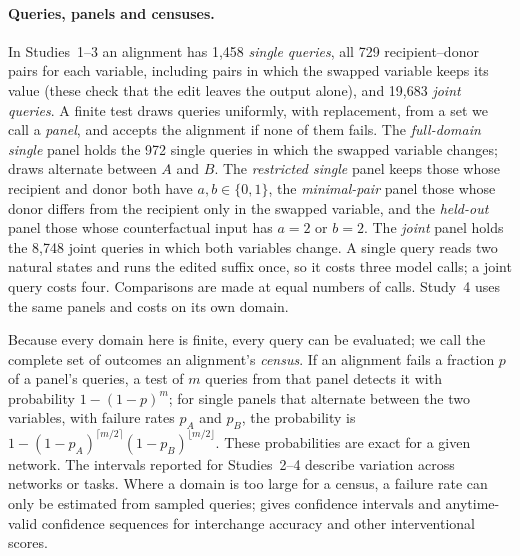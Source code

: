 \paragraph{Queries, panels and censuses.}
In Studies~1--3 an alignment has 1,458 \emph{single queries}, all 729 recipient--donor pairs for each variable,
including pairs in which the swapped variable keeps its value (these check that the edit leaves the output alone), and
19,683 \emph{joint queries}. A finite test draws queries uniformly, with replacement, from a set we call a
\emph{panel}, and accepts the alignment if none of them fails. The \emph{full-domain single} panel holds the 972 single
queries in which the swapped variable changes; draws alternate between $A$ and $B$. The \emph{restricted single} panel
keeps those whose recipient and donor both have $a,b\in\{0,1\}$, the \emph{minimal-pair} panel those whose donor
differs from the recipient only in the swapped variable, and the \emph{held-out} panel those whose counterfactual input
has $a=2$ or $b=2$. The \emph{joint} panel holds the 8,748 joint queries in which both variables change. A single
query reads two natural states and runs the edited suffix once, so it costs three model calls; a joint query costs
four. Comparisons are made at equal numbers of calls. Study~4 uses the same panels and costs on its own domain.

Because every domain here is finite, every query can be evaluated; we call the complete set of outcomes an
alignment's \emph{census}. If an alignment fails a fraction $p$ of a panel's queries, a test of $m$ queries from
that panel detects it with probability $1-(1-p)^m$; for single panels that alternate between the two variables,
with failure rates $p_A$ and $p_B$, the probability is $1-(1-p_A)^{\lceil m/2\rceil}(1-p_B)^{\lfloor m/2\rfloor}$.
These probabilities are exact for a given network. The intervals reported for Studies~2--4 describe variation across
networks or tasks. Where a domain is too large for a census, a failure rate can only be estimated from sampled
queries; \citet{asiaee2026certified} gives confidence intervals and anytime-valid confidence sequences for interchange
accuracy and other interventional scores.
